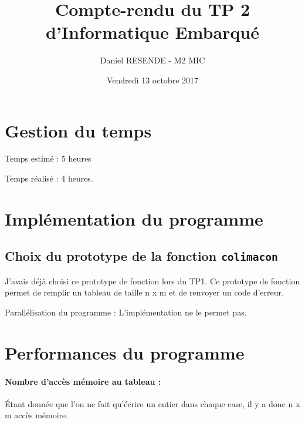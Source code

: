 \documentclass[a4paper,11pt]{article}
\title{Compte-rendu du TP 2 d'Informatique Embarqué}
\author{Daniel RESENDE - M2 MIC}
\date{Vendredi 13 octobre 2017}
\begin{document}
\maketitle

\section{Gestion du temps}
Temps estimé : 5 heures

Temps réalisé : 4 heures.

\section{Implémentation du programme}



\subsection*{Choix du prototype de la fonction \texttt{colimacon}}
	J'avais déjà choisi ce prototype de fonction lors du TP1. Ce prototype de fonction permet de remplir un tableau de taille n x m et de renvoyer un code d'erreur.

Parallélisation du programme :
L'implémentation ne le permet pas.

\section{Performances du programme}

\paragraph{Nombre d'accès mémoire au tableau :}
Étant donnée que l'on ne fait qu'écrire un entier dans chaque case, il y a donc n x m accès mémoire.
\end{document}

